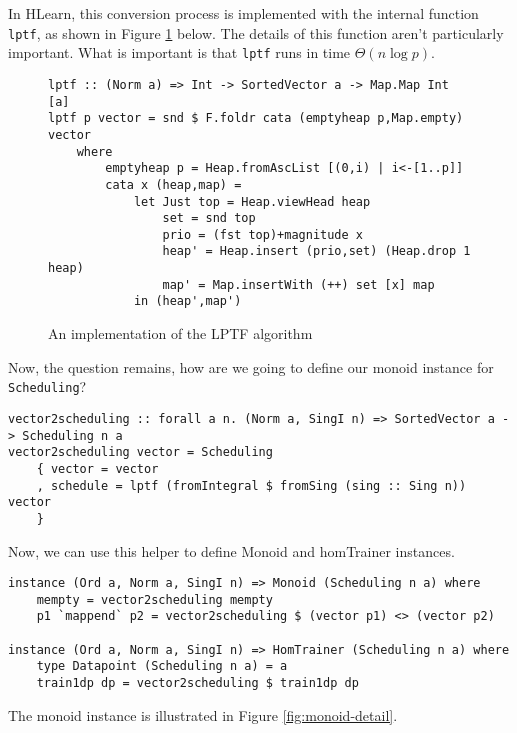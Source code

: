 \documentclass[tikz]{tmr}
\newcommand\+{\mdoubleplus}
\begin{document}
In HLearn, this conversion process is implemented with the internal function \lstinline{lptf}, as shown in Figure \ref{code:lptf} below.
The details of this function aren't particularly important.
What is important is that \lstinline{lptf} runs in time $\Theta(n\log p)$.

\begin{figure}
\caption{An implementation of the LPTF algorithm}
\label{code:lptf}
\begin{lstlisting}
lptf :: (Norm a) => Int -> SortedVector a -> Map.Map Int [a]
lptf p vector = snd $ F.foldr cata (emptyheap p,Map.empty) vector
    where
        emptyheap p = Heap.fromAscList [(0,i) | i<-[1..p]]
        cata x (heap,map) = 
            let Just top = Heap.viewHead heap
                set = snd top
                prio = (fst top)+magnitude x
                heap' = Heap.insert (prio,set) (Heap.drop 1 heap)
                map' = Map.insertWith (++) set [x] map
            in (heap',map')

\end{lstlisting}
\end{figure}

Now, the question remains, how are we going to define our monoid instance for \lstinline{Scheduling}?

\begin{lstlisting}
vector2scheduling :: forall a n. (Norm a, SingI n) => SortedVector a -> Scheduling n a
vector2scheduling vector = Scheduling
    { vector = vector
    , schedule = lptf (fromIntegral $ fromSing (sing :: Sing n)) vector
    }
\end{lstlisting}

Now, we can use this helper to define Monoid and homTrainer instances.

\begin{lstlisting}
instance (Ord a, Norm a, SingI n) => Monoid (Scheduling n a) where
    mempty = vector2scheduling mempty
    p1 `mappend` p2 = vector2scheduling $ (vector p1) <> (vector p2)

instance (Ord a, Norm a, SingI n) => HomTrainer (Scheduling n a) where
    type Datapoint (Scheduling n a) = a
    train1dp dp = vector2scheduling $ train1dp dp
\end{lstlisting}

The monoid instance is illustrated in Figure \ref{fig:monoid-detail}.
\end{document}
